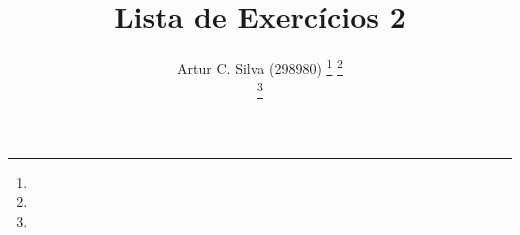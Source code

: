 \title{Lista de Exercícios 2}

\author{Artur C. Silva (298980)%
\thanks{
	
}%
\thanks{}


\thanks{

}

}

\maketitle

